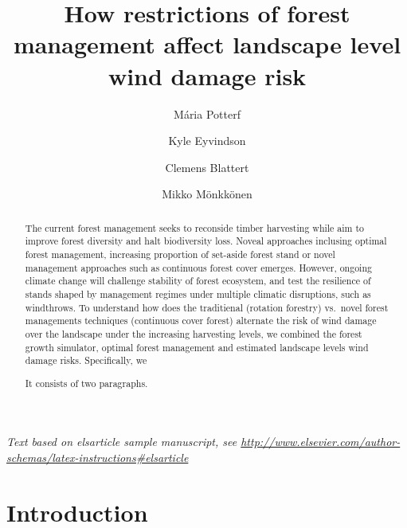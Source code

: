 \documentclass[]{elsarticle} %
\begin{document}
\begin{frontmatter}

  \title{How restrictions of forest management affect landscape level wind damage
risk}
    \author[Department of Biological and Environmental Science]{Mária Potterf}
    \author[Department of Biological and Environmental Science]{Kyle Eyvindson}
    \author[Department of Biological and Environmental Science]{Clemens Blattert}
    \author[Department of Biological and Environmental Science]{Mikko Mönkkönen}
      \address[University of Jyvaskyla]{Department of Biological and Environmental Science, University of
Jyvaskyla, P.O. Box 35, FI-40014 Jyvaskyla, Finland}
    \address[LUKE]{THIS is Luke address Department, Street, City, State, Zip}
    \cortext[]{}
  
  \begin{abstract}
  The current forest management seeks to reconside timber harvesting while
  aim to improve forest diversity and halt biodiversity loss. Noveal
  approaches inclusing optimal forest management, increasing proportion of
  set-aside forest stand or novel management approaches such as continuous
  forest cover emerges. However, ongoing climate change will challenge
  stability of forest ecosystem, and test the resilience of stands shaped
  by management regimes under multiple climatic disruptions, such as
  windthrows. To understand how does the traditienal (rotation forestry)
  vs.~novel forest managements techniques (continuous cover forest)
  alternate the risk of wind damage over the landscape under the
  increasing harvesting levels, we combined the forest growth simulator,
  optimal forest management and estimated landscape levels wind damage
  risks. Specifically, we
  
  It consists of two paragraphs.
  \end{abstract}
  
 \end{frontmatter}

\emph{Text based on elsarticle sample manuscript, see
\url{http://www.elsevier.com/author-schemas/latex-instructions\#elsarticle}}

\section{Introduction}\label{introduction}
\end{document}
